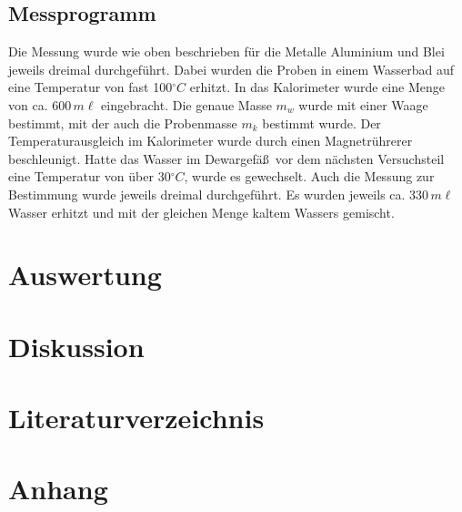 \documentclass[11pt,ngerman,a4paper]{article}
\begin{document}
\subsection{Messprogramm}
Die Messung wurde wie oben beschrieben f\"ur die Metalle Aluminium und Blei jeweils dreimal durchgef\"uhrt. Dabei wurden die Proben in einem Wasserbad auf eine Temperatur von fast 100$^\circ C$ erhitzt. In das Kalorimeter wurde eine Menge von ca. $600\,m\ell$ eingebracht. Die genaue Masse $m_w$ wurde mit einer Waage bestimmt, mit der auch die Probenmasse $m_k$ bestimmt wurde. Der Temperaturausgleich im Kalorimeter wurde durch einen Magnetr\"uhrerer beschleunigt. Hatte das Wasser im Dewargef\"a\ss\ vor dem n\"achsten Versuchsteil eine Temperatur von \"uber 30$^\circ C$, wurde es gewechselt. Auch die Messung zur Bestimmung wurde jeweils dreimal durchgef\"uhrt. Es wurden jeweils ca. $330\,m\ell$ Wasser erhitzt und mit der gleichen Menge kaltem Wassers gemischt.

\section{Auswertung}

\section{Diskussion}


\section{Literaturverzeichnis}

\section{Anhang}
\end{document}

